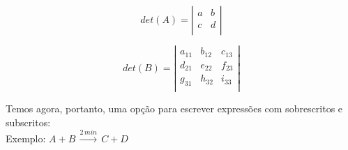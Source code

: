 \documentclass[a4paper, 12pt]{article}
\begin{document}
\begin{equation}
det(A) =
\left\vert
\begin{array}{lr}
	a & b \\
	c & d \\
\end{array}
\right\vert
\end{equation}

\vspace{0.5cm}

\begin{equation}
det(B) =
\left\vert
\begin{array}{lcr}
	a_{11} & b_{12} & c_{13} \\
	d_{21} & e_{22} & f_{23} \\
	g_{31} & h_{32} & i_{33} \\
\end{array}
\right\vert
\end{equation}

\vspace{0.5cm}

Temos agora, portanto, uma opção para escrever expressões com sobrescritos e subscritos:\\


Exemplo: $A + B\, \stackrel{2\,min}{\longrightarrow}\, C + D$
\end{document}
